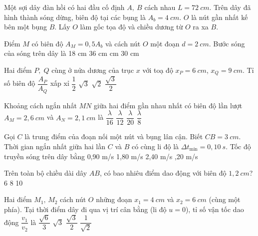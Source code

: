 \begin{vidu}
Một sợi dây đàn hồi có hai đầu cố định $A,\ B$ cách nhau $L = 72\ cm$. Trên dây đã hình thành sóng dừng, biên độ tại các bụng là $A_b = 4\ cm$. $O$ là nút gần nhất kế bên một bụng $B$. Lấy $O$ làm gốc tọa độ và chiều dương từ $O$ ra xa $B$.
\item[1.] Điểm $M$ có biên độ $A_M = 0,5A_b$ và cách nút $O$ một đoạn $d = 2\ cm$.  
Bước sóng của sóng trên dây là
\choice
{18 cm}
{36 cm}
{ cm}
{30 cm}	
\item[2.] Hai điểm $P,\;Q$ cùng ở nửa dương của trục $x$ với toạ độ $x_P = 6\ cm$, $x_Q = 9\ cm$. Tỉ số biên độ $\dfrac{A_P}{A_Q}$ xấp xỉ
\choice
{$\dfrac12$}
{$\sqrt{3}$}
{\True $\sqrt{2}$}
{$\dfrac{\sqrt{3}}{2}$}
\item[3.] Khoảng cách ngắn nhất $MN$ giữa hai điểm gần nhau nhất có biên độ lần lượt  
$A_M = 2,6\ cm$ và $A_N = 2,1\ cm$ là
\choice
{$\dfrac{\lambda}{16}$}
{$\dfrac{\lambda}{12}$}
{\True $\dfrac{\lambda}{20}$}
{$\dfrac{\lambda}{8}$}
\item[4.] Gọi $C$ là trung điểm của đoạn nối một nút và bụng lân cận. Biết $CB = 3\ cm$. Thời gian ngắn nhất giữa hai lần $C$ và $B$ có cùng li độ là $\Delta t_{\min}=0,10\ s$.  
Tốc độ truyền sóng trên dây bằng
\choice
{0,90 m/s}
{1,80 m/s}
{2,40 m/s}
{,20 m/s}
\item[5.] Trên toàn bộ chiều dài dây $AB$, có bao nhiêu điểm dao động với biên độ $1,2\ cm$?
\choice
{6}
{8}
{10}
{}
\item[6.] Hai điểm $M_1,\,M_2$ cách nút $O$ những đoạn $x_1 = 4\ cm$ và $x_2 = 6\ cm$ (cùng một phía).  
Tại thời điểm dây đi qua vị trí cân bằng (li độ $u=0$), tỉ số vận tốc dao động $\dfrac{v_1}{v_2}$ là
\choice
{$\dfrac{\sqrt{6}}{3}$}
{$\sqrt{3}$}
{\True $\dfrac{\sqrt{3}}{2}$}
{$\dfrac{1}{\sqrt{2}}$}
\end{vidu}
